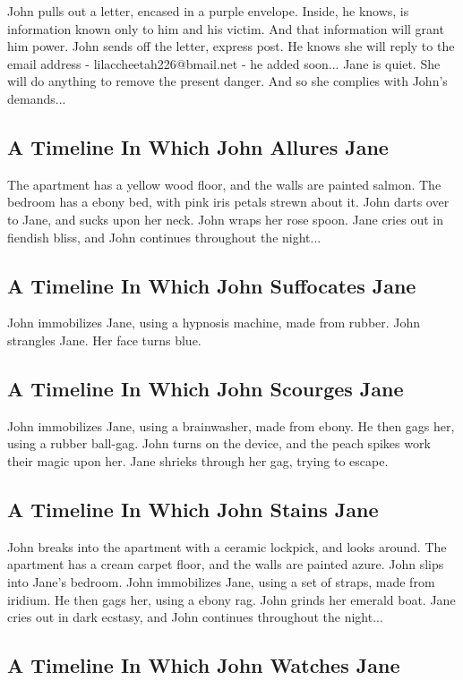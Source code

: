 \documentclass{article}
\begin{document}
John pulls out a letter, encased in a purple envelope. Inside, he knows, is information known only to him and his victim. And that information will grant him power.
John sends off the letter, express post. He knows she will reply to the email address {-} lilaccheetah226@bmail.net {-} he added soon...
Jane is quiet. She will do anything to remove the present danger. And so she complies with John's demands...
\subsection{A Timeline In Which John Allures Jane}


The apartment has a yellow wood floor, and the walls are painted salmon.
The bedroom has a ebony bed, with pink iris petals strewn about it.
John darts over to Jane, and sucks upon her neck.
John wraps her rose spoon.
Jane cries out in fiendish bliss, and John continues throughout the night...
\subsection{A Timeline In Which John Suffocates Jane}


John immobilizes Jane, using a hypnosis machine, made from rubber.
John strangles Jane.
Her face turns blue.
\subsection{A Timeline In Which John Scourges Jane}


John immobilizes Jane, using a brainwasher, made from ebony.
He then gags her, using a rubber ball{-}gag.
John turns on the device, and the peach spikes work their magic upon her.
Jane shrieks through her gag, trying to escape.
\subsection{A Timeline In Which John Stains Jane}


John breaks into the apartment with a ceramic lockpick, and looks around.
The apartment has a cream carpet floor, and the walls are painted azure.
John slips into Jane's bedroom.
John immobilizes Jane, using a set of straps, made from iridium.
He then gags her, using a ebony rag.
John grinds her emerald boat.
Jane cries out in dark ecstasy, and John continues throughout the night...
\subsection{A Timeline In Which John Watches Jane}
\end{document}
